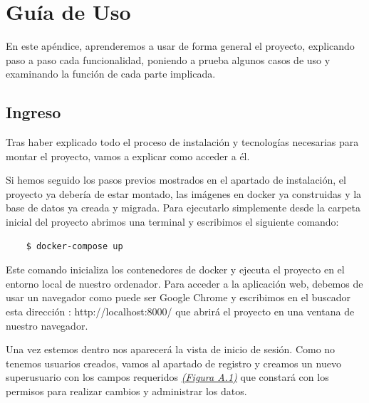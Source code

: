 \appendix 

\chapter{Guía de Uso}

En este apéndice, aprenderemos a usar de forma general el proyecto, explicando paso a paso cada funcionalidad, poniendo a prueba algunos casos de uso y examinando la función de cada parte implicada.

\section{Ingreso}

Tras haber explicado todo el proceso de instalación y tecnologías necesarias para montar el proyecto, vamos a explicar como acceder a él. 

Si hemos seguido los pasos previos mostrados en el apartado de instalación, el proyecto ya debería de estar montado, las imágenes en docker ya construidas y la base de datos ya creada y migrada. Para ejecutarlo simplemente desde la carpeta inicial del proyecto abrimos una terminal y escribimos el siguiente comando:

\begin{verbatim} 
    $ docker-compose up
\end{verbatim}

Este comando inicializa los contenedores de docker y ejecuta el proyecto en el entorno local de nuestro ordenador. Para acceder a la aplicación web, debemos de usar un navegador como puede ser Google Chrome y escribimos en el buscador esta dirección : http://localhost:8000/ que abrirá el proyecto en una ventana de nuestro navegador.

Una vez estemos dentro nos aparecerá la vista de inicio de sesión. Como no tenemos usuarios creados, vamos al apartado de registro y creamos un nuevo superusuario con los campos requeridos \textit{\hyperref[fig:vista-registro]{(Figura A.1)}} que constará con los permisos para realizar cambios y administrar los datos. \vspace{1cm}

